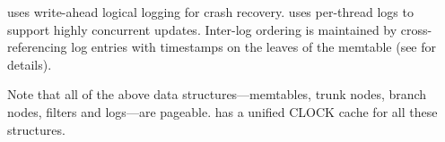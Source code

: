 \sysname uses write-ahead logical logging for crash recovery.
\sysname uses per-thread logs to support highly concurrent updates.
Inter-log ordering is maintained by cross-referencing log entries with
timestamps on the leaves of the memtable (see  for
details).

Note that all of the above data structures---memtables, trunk nodes,
branch nodes, filters and logs---are pageable.  \sysname has a unified
CLOCK cache for all these structures.
